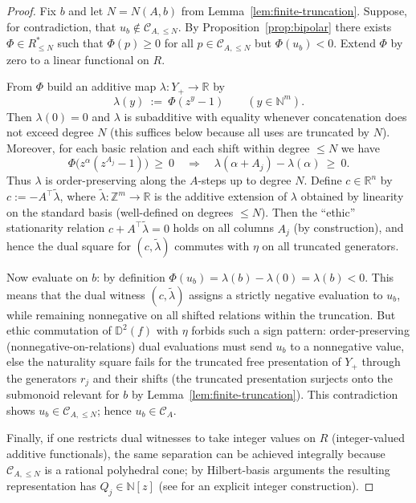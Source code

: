 \documentclass[12pt]{article}
\newcommand{\DD}{\mathbb{D}}
\theoremstyle{plain}
\theoremstyle{definition}
\theoremstyle{remark}
\numberwithin{equation}{section}
\begin{document}
\begin{proof}
Fix $b$ and let $N=N(A,b)$ from Lemma~\ref{lem:finite-truncation}. Suppose, for contradiction, that $u_b\notin \mathcal C_{A,\le N}$. By Proposition~\ref{prop:bipolar} there exists $\Phi\in R_{\le N}^*$ such that $\Phi(p)\ge 0$ for all $p\in \mathcal C_{A,\le N}$ but $\Phi(u_b)<0$. Extend $\Phi$ by zero to a linear functional on $R$.

From $\Phi$ build an additive map $\lambda:Y_+\to \mathbb R$ by
\[
\lambda(y)\ :=\ \Phi(z^y-1)\qquad (y\in \mathbb N^m).
\]
Then $\lambda(0)=0$ and $\lambda$ is subadditive with equality whenever concatenation does not exceed degree $N$ (this suffices below because all uses are truncated by $N$). Moreover, for each basic relation and each shift within degree $\le N$ we have
\[
\Phi\big(z^\alpha(z^{A_j}-1)\big)\ \ge\ 0
\quad\Rightarrow\quad
\lambda(\alpha+A_j)-\lambda(\alpha)\ \ge\ 0.
\]
Thus $\lambda$ is order-preserving along the $A$-steps up to degree $N$. Define $c\in\mathbb R^n$ by $c:=-A^\top \tilde\lambda$, where $\tilde\lambda:\mathbb Z^m\to\mathbb R$ is the additive extension of $\lambda$ obtained by linearity on the standard basis (well-defined on degrees $\le N$). Then the “ethic” stationarity relation $c+A^\top\tilde\lambda=0$ holds on all columns $A_j$ (by construction), and hence the dual square for $(c,\tilde\lambda)$ commutes with $\eta$ on all truncated generators.

Now evaluate on $b$: by definition $\Phi(u_b)=\lambda(b)-\lambda(0)=\lambda(b)<0$. This means that the dual witness $(c,\tilde\lambda)$ assigns a strictly negative evaluation to $u_b$, while remaining nonnegative on all shifted relations within the truncation. But ethic commutation of $\DD^2(f)$ with $\eta$ forbids such a sign pattern: order-preserving (nonnegative-on-relations) dual evaluations must send $u_b$ to a nonnegative value, else the naturality square fails for the truncated free presentation of $Y_+$ through the generators $r_j$ and their shifts (the truncated presentation surjects onto the submonoid relevant for $b$ by Lemma~\ref{lem:finite-truncation}). This contradiction shows $u_b\in \mathcal C_{A,\le N}$; hence $u_b\in \mathcal C_A$.

Finally, if one restricts dual witnesses to take integer values on $R$ (integer-valued additive functionals), the same separation can be achieved integrally because $\mathcal C_{A,\le N}$ is a rational polyhedral cone; by Hilbert-basis arguments the resulting representation has $Q_j\in\mathbb N[z]$ (see \cite{Lasserre2003} for an explicit integer construction).
\end{proof}
\end{document}
